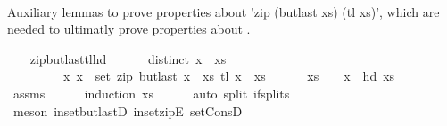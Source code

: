 \begin{isabellebody}
\ \ \ \ \ \ {\isacharparenright}{\kern0pt}{\isachardoublequoteclose}%
\begin{isamarkuptext}%
Auxiliary lemmas to prove properties about 'zip (butlast xs) (tl xs)', 
  which are needed to ultimatly prove properties about .%
\end{isamarkuptext}\isamarkuptrue%
\ \ \isamarkupfalse%
\ zip{\isacharunderscore}{\kern0pt}butlast{\isacharunderscore}{\kern0pt}tl{\isacharunderscore}{\kern0pt}hd{\isacharcolon}{\kern0pt}\ \isanewline
\ \ \ \ \ {\isachardoublequoteopen}distinct\ {\isacharparenleft}{\kern0pt}x\ {\isacharhash}{\kern0pt}\ xs{\isacharparenright}{\kern0pt}{\isachardoublequoteclose}\ \isanewline
\ \ \ \ \ \ \ \ \ {\isachardoublequoteopen}{\isacharparenleft}{\kern0pt}x\ x\ {\isasymin}\ set\ {\isacharparenleft}{\kern0pt}zip\ {\isacharparenleft}{\kern0pt}butlast\ {\isacharparenleft}{\kern0pt}x\ {\isacharhash}{\kern0pt}\ xs{\isacharparenright}{\kern0pt}{\isacharparenright}{\kern0pt}\ {\isacharparenleft}{\kern0pt}tl\ {\isacharparenleft}{\kern0pt}x\ {\isacharhash}{\kern0pt}\ xs{\isacharparenright}{\kern0pt}{\isacharparenright}{\kern0pt}{\isacharparenright}{\kern0pt}{\isachardoublequoteclose}\ \isanewline
\ \ \ \ \ {\isachardoublequoteopen}xs\ {\isasymnoteq}\ {\isacharbrackleft}{\kern0pt}{\isacharbrackright}{\kern0pt}\ {\isasymand}\ x\ {\isacharequal}{\kern0pt}\ hd\ xs{\isachardoublequoteclose}\isanewline
%
\isadelimproof
\ \ \ \ %
\endisadelimproof
%
\isatagproof
{}\isamarkupfalse%
\ assms\isanewline
\ \ \ \ \isamarkupfalse%
\ {\isacharparenleft}{\kern0pt}induction\ xs{\isacharparenright}{\kern0pt}\isanewline
\ \ \ \ \isamarkupfalse%
\ {\isacharparenleft}{\kern0pt}auto\ split{\isacharcolon}{\kern0pt}\ if{\isacharunderscore}{\kern0pt}splits{\isacharparenright}{\kern0pt}\isanewline
\ \ \ \ \isamarkupfalse%
\ {\isacharparenleft}{\kern0pt}meson\ in{\isacharunderscore}{\kern0pt}set{\isacharunderscore}{\kern0pt}butlastD\ in{\isacharunderscore}{\kern0pt}set{\isacharunderscore}{\kern0pt}zipE\ set{\isacharunderscore}{\kern0pt}ConsD{\isacharparenright}{\kern0pt}\isanewline
\ \ \ \ \isamarkupfalse%
%
\endisatagproof
{\isafoldproof}%
%
\isadelimproof
%

\end{isabellebody}
